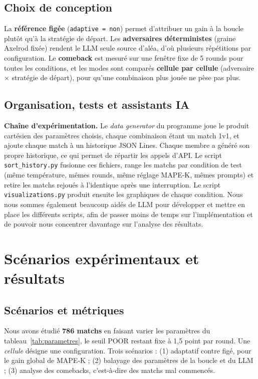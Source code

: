 \documentclass[10pt,a4paper]{article}
\begin{document}
\subsection{Choix de conception}

La \textbf{référence figée} (\texttt{adaptive = non}) permet d'attribuer un gain
à la boucle plutôt qu'à la stratégie de départ. Les \textbf{adversaires
  déterministes} (graine Axelrod fixée) rendent le LLM seule source d'aléa, d'où
plusieurs répétitions par configuration. Le \textbf{comeback} est
mesuré sur une fenêtre fixe de 5 rounds pour toutes les conditions, et les modes
sont comparés \textbf{cellule par cellule} (adversaire $\times$ stratégie de
départ), pour qu'une combinaison plus jouée ne pèse pas plus.

\subsection{Organisation, tests et assistants IA}

\textbf{Chaîne d'expérimentation.} Le \emph{data generator} du programme joue le produit cartésien des paramètres choisis, chaque combinaison étant un match 1v1, et ajoute chaque match à un historique JSON Lines. Chaque membre a généré son propre historique, ce qui permet de répartir les appels d'API. Le script \texttt{sort\_history.py} fusionne ces fichiers, range les matchs par condition de test (même température, mêmes rounds, même réglage MAPE-K, mêmes prompts) et retire les matchs rejoués à l'identique après une interruption. Le script \texttt{visualizations.py} produit ensuite les graphiques de chaque condition. Nous nous sommes également beaucoup aidés de LLM pour développer et mettre en place les différents scripts, afin de passer moins de temps sur l'implémentation et de pouvoir nous concentrer davantage sur l'analyse des résultats.


\section{Scénarios expérimentaux et résultats}

\subsection{Scénarios et métriques}

Nous avons étudié \textbf{786 matchs} en faisant varier les paramètres du
tableau~\ref{tab:parametres}, le seuil POOR restant fixe à 1,5 point par round.
Une \emph{cellule} désigne une configuration. Trois scénarios : (1) adaptatif
contre figé, pour le gain global de MAPE-K ; (2) balayage des paramètres de la
boucle et du LLM ; (3) analyse des comebacks, c'est-à-dire des matchs mal
commencés.
\end{document}
